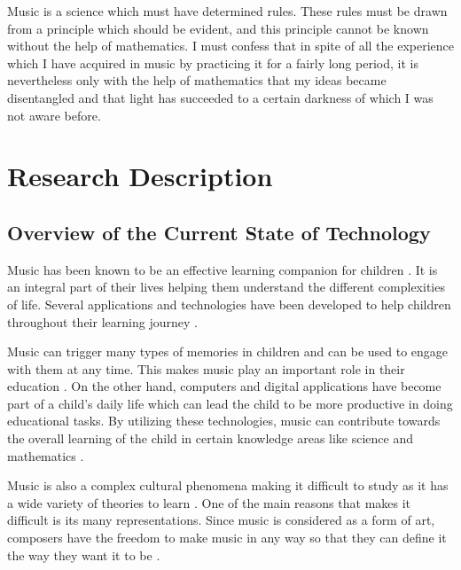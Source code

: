 %
%
%                 

\epigraph{Music is a science which must have determined rules. These rules must be drawn from a principle which should be evident, and this principle cannot be known without the help of mathematics. I must confess that in spite of all the experience which I have acquired in music by practicing it for a fairly long period, it is nevertheless only with the help of mathematics that my ideas became disentangled and that light has succeeded to a certain darkness of which I was not aware before.}{\textit{\citep{rameau1722traite}}}


\chapter{Research Description}
\label{sec:researchdesc}    %

 
\section{Overview of the Current State of Technology}
\label{sec:overview}

Music has been known to be an effective learning companion for children \cite{mcintire2007developing}. 
It is an integral part of their lives helping them understand the different complexities of life. Several applications and technologies have been developed to help children throughout their learning journey \cite{roschelle2000changing}.

Music can trigger many types of memories in children and can be used to engage with them at any time. This makes music play an important role in their education \cite{levinowitz1999importance}. On the other hand, computers and digital applications have become part of a child's daily life which can lead the child to be more productive in doing educational tasks. By utilizing these technologies, music can contribute towards the overall learning of the child in certain knowledge areas like science and mathematics \cite{zaranis2013using}.

Music is also a complex cultural phenomena making it difficult to study as it has a wide variety of theories to learn \cite{byrd2009studying}. 
One of the main reasons that makes it difficult is its many representations. Since music is considered as a form of art, composers have the freedom to make music in any way so that they can define it the way they want it to be \cite{byrd2009studying}. 

